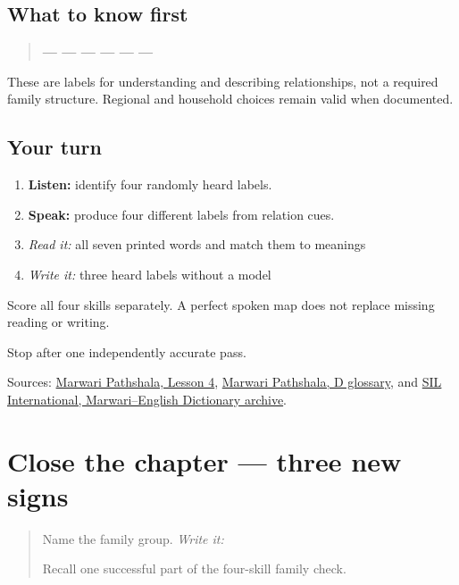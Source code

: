 \subsection*{What to know first}
\begin{quote}
\textbf{ —  —  —  —  —  — }
\end{quote}

These are labels for understanding and describing relationships, not a required family structure. Regional and household choices remain valid when documented.

\subsection*{Your turn}
\begin{enumerate}
\raggedright
  \item \textbf{Listen:} identify four randomly heard labels.
  \item \textbf{Speak:} produce four different labels from relation cues.
  \item \emph{Read it:} all seven printed words and match them to meanings
  \item \emph{Write it:} three heard labels without a model
\end{enumerate}

Score all four skills separately. A perfect spoken map does not replace missing reading or writing.

\begin{tcolorbox}[breakable,colback=teal!4,colframe=teal!35!black,title={Before you move on}]
Stop after one independently accurate pass.

Sources: \href{https://www.marwaripathshala.com/marwari-lesson-4-english}{Marwari Pathshala, Lesson 4}, \href{https://www.marwaripathshala.com/d-glossary-of-rajasthani-language}{Marwari Pathshala, D glossary}, and \href{https://nepal.sil.org/resources/archives/63768}{SIL International, Marwari–English Dictionary archive}.
\end{tcolorbox}
\section[Practice]{Close the chapter — three new signs}

\label{lesson:MW-R08-script-close}



\begin{quote}
Name the family group. \emph{Write it:} \textbf{}

Recall one successful part of the four-skill family check.
\end{quote}

